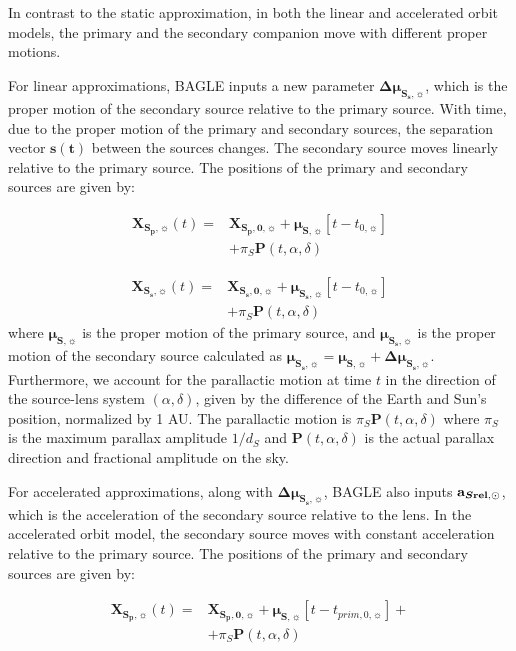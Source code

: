 \documentclass[twocolumn]{aastex701}
\newcommand{\vect}[1]{\boldsymbol{#1}}
\newcommand{\accSsec}{\bold{a}_{\boldsymbol{S\mathrm{rel}},\sun}}
\newcommand{\tnot}{t_{0,\sun}}
\newcommand{\musvec}{\vect{\mu}_{\boldsymbol{S},\sun}}
\newcommand{\mussvec}{\vect{\mu}_{\boldsymbol{S_s},\sun}}
\newcommand{\deltamussvec}{\vect{\Delta\mu}_{\boldsymbol{S_s},\sun}}
\newcommand{\Xspovec}{\vect{X}_{\boldsymbol{S_p,0},\sun}}
\newcommand{\Xssovec}{\vect{X}_{\boldsymbol{S_s,0},\sun}}
\newcommand{\Xspvec}{\vect{X}_{\boldsymbol{S_p},\sun}}
\newcommand{\Xssvec}{\vect{X}_{\boldsymbol{S_s},\sun}}
\newcommand{\tpnot}{t_{prim,0,\sun}}
\begin{document}
In contrast to the static approximation, in both the linear and accelerated orbit models, the primary and the secondary companion move with different proper motions. 

For linear approximations, BAGLE inputs a new parameter $\deltamussvec$, which is the proper motion of the secondary source relative to the primary source. With time, due to the proper motion of the primary and secondary sources, the separation vector $\vect{s(t)}$ between the sources changes. The secondary source moves linearly relative to the primary source. The positions of the primary and secondary sources are given by:

\begin{align}
    \Xspvec (t) = & \Xspovec + \musvec [t - \tnot] \nonumber \\
    &+\pi_S \vect{P}(t, \alpha, \delta)  
    \label{linear_motion}    
\end{align}


\begin{align}
    \Xssvec (t) = & \Xssovec + \mussvec [t - \tnot ]\nonumber \\
    &+\pi_S \vect{P}(t, \alpha, \delta)  
    \label{linear_motion2}    
\end{align}
%
where $\musvec$ is the proper motion of the primary source, and $\mussvec$ is the proper motion of the secondary source calculated as $\mussvec = \musvec + \deltamussvec$. Furthermore, we account for the parallactic motion at time $t$ in the direction of the source-lens system $(\alpha, \delta)$, given by the difference of the Earth and Sun's position, normalized by 1 AU.  The parallactic motion is $\pi_S
\vect{P}(t, \alpha, \delta)$ where $\pi_S$ is the
maximum parallax amplitude $1/d_S$ and $\vect{P}(t, \alpha, \delta)$ is the actual parallax direction and fractional amplitude on the sky.

For accelerated approximations, along with $\deltamussvec$, BAGLE also inputs $\accSsec$, which is the acceleration of the secondary source relative to the lens. In the accelerated orbit model, the secondary source moves with constant acceleration relative to the primary source. The positions of the primary and secondary sources are given by: 




\begin{align}
    \Xspvec (t) = & \Xspovec + \musvec [t - \tpnot] \nonumber + \\
    &+\pi_S \vect{P}(t, \alpha, \delta)  
    \label{accelerated motion}    
\end{align}
\end{document}
